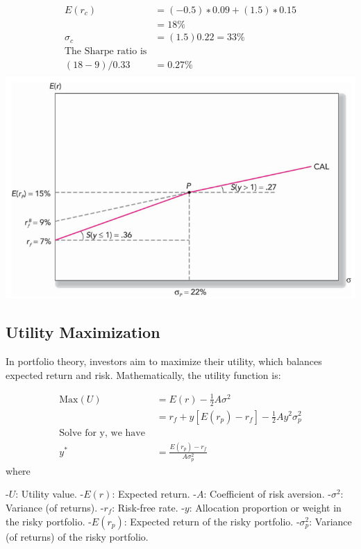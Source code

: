 \documentclass[
]{book}
\begin{document}
\[
\begin{aligned}
      𝐸(r_c) &= (−0.5)∗0.09+(1.5)∗0.15\\
              &=18\% \\
       \sigma_c &= (1.5)0.22 = 33\% \\
\text{The Sharpe ratio is} \\
    (18−9)/0.33 &= 0.27\% \\
\end{aligned}
\] \includegraphics{Resources/capaloocation2.png}

\hypertarget{utility-maximization}{%
\subsection{Utility Maximization}\label{utility-maximization}}

In portfolio theory, investors aim to maximize their utility, which
balances expected return and risk. Mathematically, the utility function
is:

\[
\begin{aligned}
\text{Max}(U) &= E(r) - \frac{1}{2} A \sigma^2 \\
&= r_f + y [E(r_p) - r_f] - \frac{1}{2} A y^2 \sigma_p^2 \\
\text{Solve for y, we have } \\
y^* &= \frac{E(r_p) - r_f}{A \sigma_p^2}
\end{aligned}
\] where

-\(U\): Utility value. -\(E(r)\): Expected return. -\(A\): Coefficient
of risk aversion. -\(\sigma^2\): Variance (of returns). -\(r_f\):
Risk-free rate. -\(y\): Allocation proportion or weight in the risky
portfolio. -\(E(r_p)\): Expected return of the risky portfolio.
-\(\sigma_p^2\): Variance (of returns) of the risky portfolio.
\end{document}
